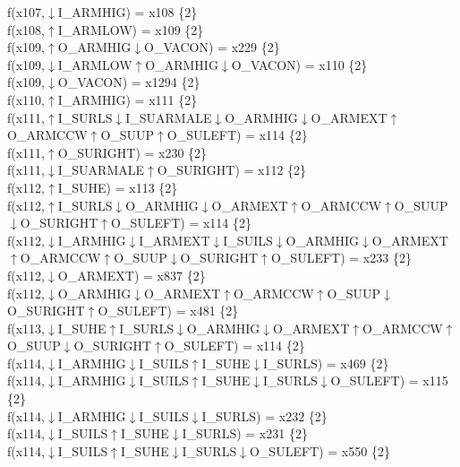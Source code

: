 f(x107,$\downarrow$I\_ARMHIG) = x108 \{2\} \\  
f(x108,$\uparrow$I\_ARMLOW) = x109 \{2\} \\  
f(x109,$\uparrow$O\_ARMHIG$\downarrow$O\_VACON) = x229 \{2\} \\  
f(x109,$\downarrow$I\_ARMLOW$\uparrow$O\_ARMHIG$\downarrow$O\_VACON) = x110 \{2\} \\  
f(x109,$\downarrow$O\_VACON) = x1294 \{2\} \\  
f(x110,$\uparrow$I\_ARMHIG) = x111 \{2\} \\  
f(x111,$\uparrow$I\_SURLS$\downarrow$I\_SUARMALE$\downarrow$O\_ARMHIG$\downarrow$O\_ARMEXT$\uparrow$O\_ARMCCW$\uparrow$O\_SUUP$\uparrow$O\_SULEFT) = x114 \{2\} \\  
f(x111,$\uparrow$O\_SURIGHT) = x230 \{2\} \\  
f(x111,$\downarrow$I\_SUARMALE$\uparrow$O\_SURIGHT) = x112 \{2\} \\  
f(x112,$\uparrow$I\_SUHE) = x113 \{2\} \\  
f(x112,$\uparrow$I\_SURLS$\downarrow$O\_ARMHIG$\downarrow$O\_ARMEXT$\uparrow$O\_ARMCCW$\uparrow$O\_SUUP$\downarrow$O\_SURIGHT$\uparrow$O\_SULEFT) = x114 \{2\} \\  
f(x112,$\downarrow$I\_ARMHIG$\downarrow$I\_ARMEXT$\downarrow$I\_SUILS$\downarrow$O\_ARMHIG$\downarrow$O\_ARMEXT$\uparrow$O\_ARMCCW$\uparrow$O\_SUUP$\downarrow$O\_SURIGHT$\uparrow$O\_SULEFT) = x233 \{2\} \\  
f(x112,$\downarrow$O\_ARMEXT) = x837 \{2\} \\  
f(x112,$\downarrow$O\_ARMHIG$\downarrow$O\_ARMEXT$\uparrow$O\_ARMCCW$\uparrow$O\_SUUP$\downarrow$O\_SURIGHT$\uparrow$O\_SULEFT) = x481 \{2\} \\  
f(x113,$\downarrow$I\_SUHE$\uparrow$I\_SURLS$\downarrow$O\_ARMHIG$\downarrow$O\_ARMEXT$\uparrow$O\_ARMCCW$\uparrow$O\_SUUP$\downarrow$O\_SURIGHT$\uparrow$O\_SULEFT) = x114 \{2\} \\  
f(x114,$\downarrow$I\_ARMHIG$\downarrow$I\_SUILS$\uparrow$I\_SUHE$\downarrow$I\_SURLS) = x469 \{2\} \\  
f(x114,$\downarrow$I\_ARMHIG$\downarrow$I\_SUILS$\uparrow$I\_SUHE$\downarrow$I\_SURLS$\downarrow$O\_SULEFT) = x115 \{2\} \\  
f(x114,$\downarrow$I\_ARMHIG$\downarrow$I\_SUILS$\downarrow$I\_SURLS) = x232 \{2\} \\  
f(x114,$\downarrow$I\_SUILS$\uparrow$I\_SUHE$\downarrow$I\_SURLS) = x231 \{2\} \\  
f(x114,$\downarrow$I\_SUILS$\uparrow$I\_SUHE$\downarrow$I\_SURLS$\downarrow$O\_SULEFT) = x550 \{2\} \\  
